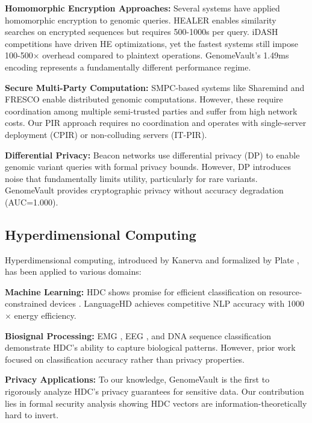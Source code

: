 \documentclass[11pt,a4paper]{article}
\begin{document}
\textbf{Homomorphic Encryption Approaches:} Several systems have applied homomorphic encryption to genomic queries. HEALER \cite{chen2016healer} enables similarity searches on encrypted sequences but requires 500-1000s per query. iDASH competitions \cite{wang2017genome} have driven HE optimizations, yet the fastest systems still impose 100-500$\times$ overhead compared to plaintext operations. GenomeVault's 1.49ms encoding represents a fundamentally different performance regime.

\textbf{Secure Multi-Party Computation:} SMPC-based systems like Sharemind \cite{kamm2013sharemind} and FRESCO \cite{keller2020mpspdz} enable distributed genomic computations. However, these require coordination among multiple semi-trusted parties and suffer from high network costs. Our PIR approach requires no coordination and operates with single-server deployment (CPIR) or non-colluding servers (IT-PIR).

\textbf{Differential Privacy:} Beacon networks \cite{raisaro2018protecting} use differential privacy (DP) to enable genomic variant queries with formal privacy bounds. However, DP introduces noise that fundamentally limits utility, particularly for rare variants. GenomeVault provides cryptographic privacy without accuracy degradation (AUC=1.000).

\subsection{Hyperdimensional Computing}

Hyperdimensional computing, introduced by Kanerva \cite{kanerva2009hyperdimensional} and formalized by Plate \cite{plate1995holographic}, has been applied to various domains:

\textbf{Machine Learning:} HDC shows promise for efficient classification on resource-constrained devices \cite{imani2019framework,rahimi2020hyperdimensional}. LanguageHD \cite{imani2019adapthd} achieves competitive NLP accuracy with 1000$\times$ energy efficiency.

\textbf{Biosignal Processing:} EMG \cite{hernandez2019yielding}, EEG \cite{burrello2020hyperdimensional}, and DNA sequence classification \cite{poduval2020genetic} demonstrate HDC's ability to capture biological patterns. However, prior work focused on classification accuracy rather than privacy properties.

\textbf{Privacy Applications:} To our knowledge, GenomeVault is the first to rigorously analyze HDC's privacy guarantees for sensitive data. Our contribution lies in formal security analysis showing HDC vectors are information-theoretically hard to invert.
\end{document}
